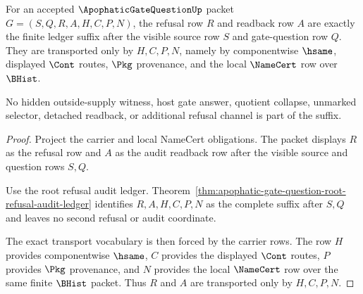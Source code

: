 \begin{theorem}
\label{thm:apophatic-gate-question-refusal-readback-exactness}
For an accepted $\ApophaticGateQuestionUp$ packet $G=(S,Q,R,A,H,C,P,N)$, the refusal row $R$ and readback row $A$ are exactly the finite ledger suffix after the visible source row $S$ and gate-question row $Q$. They are transported only by $H,C,P,N$, namely by componentwise $\hsame$, displayed $\Cont$ routes, $\Pkg$ provenance, and the local $\NameCert$ row over $\BHist$.

No hidden outside-supply witness, host gate answer, quotient collapse, unmarked selector, detached readback, or additional refusal channel is part of the suffix.
\end{theorem}
\begin{proof}
Project the carrier and local NameCert obligations. The packet displays $R$ as the refusal row and $A$ as the audit readback row after the visible source and question rows $S,Q$.

Use the root refusal audit ledger. Theorem~\ref{thm:apophatic-gate-question-root-refusal-audit-ledger} identifies $R,A,H,C,P,N$ as the complete suffix after $S,Q$ and leaves no second refusal or audit coordinate.

The exact transport vocabulary is then forced by the carrier rows. The row $H$ provides componentwise $\hsame$, $C$ provides the displayed $\Cont$ routes, $P$ provides $\Pkg$ provenance, and $N$ provides the local $\NameCert$ row over the same finite $\BHist$ packet. Thus $R$ and $A$ are transported only by $H,C,P,N$.
\end{proof}

